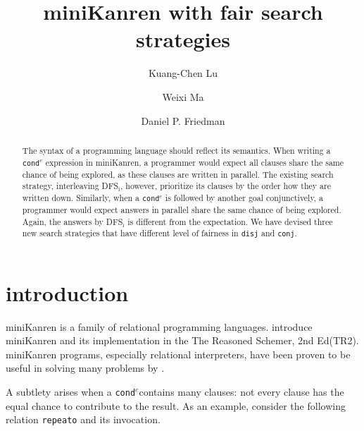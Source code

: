 \documentclass[format=acmlarge, review=true, authordraft=true]{acmart}
\title{miniKanren with fair search strategies}
\author{Kuang-Chen Lu}
\affiliation{Indiana University}
\author{Weixi Ma}
\affiliation{Indiana University}
\author{Daniel P. Friedman}
\affiliation{Indiana University}
\newcommand{\conde}{\texttt{cond$^e$}}
\newcommand{\conj}{\texttt{conj}}
\newcommand{\disj}{\texttt{disj}}
\newcommand{\DFSi}[0]{DFS$_\textrm{i}$}
\begin{document}
\begin{abstract}

The syntax of a programming language should reflect its semantics. When writing 
a \conde{} expression in miniKanren, a programmer would expect all clauses 
share the same chance of being explored, as these clauses are written in 
parallel. The existing search strategy, interleaving \DFSi{}, 
however, prioritize its clauses by the order how they are written down. 
Similarly, when a \conde{} is followed by another goal conjunctively, a 
programmer would expect answers in parallel share the same chance of being 
explored. Again, the answers by DFS$_\textrm{i}$ is different from the 
expectation. We have devised three new search strategies that have different 
level of fairness in \disj{} and \conj{}.


\end{abstract}

\maketitle

\section{introduction}

miniKanren is a family of relational programming languages.
\citet{friedman_reasoned_2018} introduce miniKanren and its implementation
in the The Reasoned Schemer, 2nd Ed(TR2). miniKanren programs, especially
relational interpreters, have been proven to be useful in solving many problems 
by \citet{byrd2017unified}. 

A subtlety arises when a \conde contains many clauses: not every clause has the 
equal chance to contribute to the result. As an example, consider the following 
relation \texttt{repeato} and its invocation. 
\end{document}
